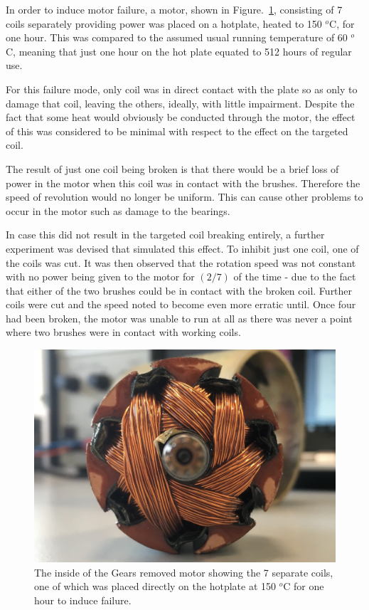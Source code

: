 
In order to induce motor failure, a motor, shown in Figure.~\ref{fig:hotplate_motor}, consisting of 7 coils separately providing power was placed on a hotplate, heated to 150 $^o$C, for one hour. This was compared to the assumed usual running temperature of 60 $^o$C, meaning that just one hour on the hot plate equated to 512 hours of regular use.

For this failure mode, only coil was in direct contact with the plate so as only to damage that coil, leaving the others, ideally, with little impairment. Despite the fact that some heat would obviously be conducted through the motor, the effect of this was considered to be minimal with respect to the effect on the targeted coil.

The result of just one coil being broken is that there would be a brief loss of power in the motor when this coil was in contact with the brushes. Therefore the speed of revolution would no longer be uniform. This can cause other problems to occur in the motor such as damage to the bearings. 

In case this did not result in the targeted coil breaking entirely, a further experiment was devised that simulated this effect. To inhibit just one coil, one of the coils was cut. It was then observed that the rotation speed was not constant with no power being given to the motor for $({2}/{7})$ of the time - due to the fact that either of the two brushes could be in contact with the broken coil. Further coils were cut and the speed noted to become even more erratic until. Once four had been broken, the motor was unable to run at all as there was never a point where two brushes were in contact with working coils.

\begin{figure}[t]
    \includegraphics[width=1.0\textwidth]{fig/Gears_Removed_Inside.JPG}
    \caption[Motor Placed on Hotplate]{The inside of the Gears removed motor showing the 7 separate coils, one of which was placed directly on the hotplate at 150 $^o$C for one hour to induce failure.}
    \label{fig:hotplate_motor}
\end{figure}

